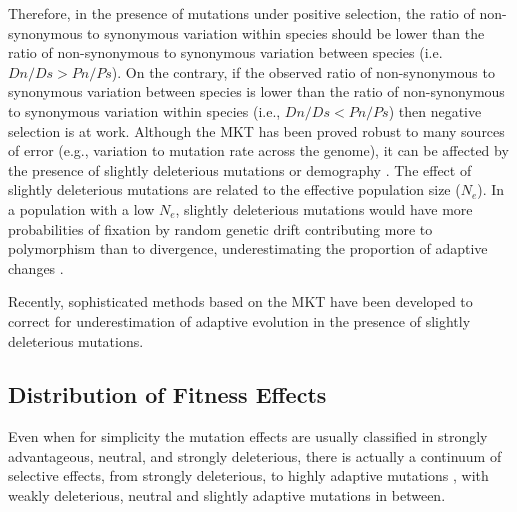 Therefore, in the presence of mutations under positive selection, the ratio of non-synonymous to synonymous variation within species should be lower than the ratio of non-synonymous to synonymous variation between species (i.e. $Dn/Ds > Pn/Ps$). 
On the contrary, if the observed ratio of non-synonymous to synonymous variation between species is lower than the ratio of non-synonymous to synonymous variation within species (i.e., $Dn/Ds < Pn/Ps$) then negative selection is at work.
%
Although the MKT has been proved robust to many sources of error (e.g., variation to mutation rate across the genome), it can be affected by the presence of slightly deleterious mutations or demography \citep{Messer2013,Eyre-Walker2006a}. 
%
The effect of slightly deleterious mutations are related to the effective population size ($N_{e}$). In a population with a low $N_{e}$, slightly deleterious mutations would have more probabilities of fixation by random genetic drift contributing more to polymorphism than to divergence, underestimating the proportion of adaptive changes \citep{Messer2013}.

Recently, sophisticated methods based on the MKT have been developed to correct for underestimation of adaptive evolution in the presence of slightly deleterious mutations. 


\subsection{Distribution of Fitness Effects}

Even when for simplicity the mutation effects are usually classified in strongly advantageous, neutral, and strongly deleterious, there is actually a continuum of selective effects, from strongly deleterious, 
to highly adaptive mutations	\citep{Eyre-Walker2007}, with weakly deleterious, neutral and slightly adaptive mutations in between.

